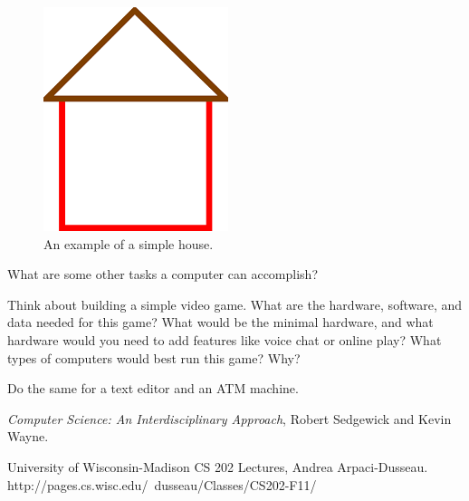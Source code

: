 \begin{figure}
  \centering
    \includegraphics[width=.32\textwidth]{images/simple_house.png}
    \caption{An example of a simple house.}
    \label{fig:house-drawing}
\end{figure}

\begin{exercise}
What are some other tasks a computer can accomplish?
\end{exercise}

\begin{exercise}
  Think about building a simple video game. What are the hardware, software, and
  data needed for this game? What would be the minimal hardware, and what
  hardware would you need to add features like voice chat or online play? What
  types of computers would best run this game? Why?

  Do the same for a text editor and an ATM machine. 
\end{exercise}



\textit{Computer Science: An Interdisciplinary Approach}, Robert Sedgewick and Kevin Wayne.

University of Wisconsin-Madison CS 202 Lectures, Andrea Arpaci-Dusseau.\\http://pages.cs.wisc.edu/~dusseau/Classes/CS202-F11/

\theendnotes
